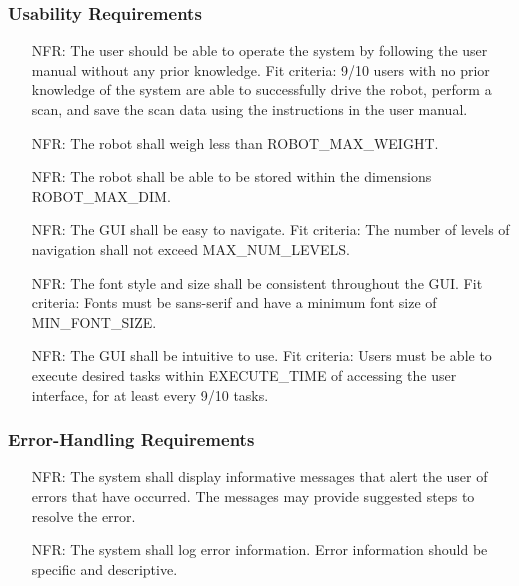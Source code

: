 \documentclass[12pt]{article}
\newcounter{nfrnum} %
\begin{document}
\subsubsection{Usability Requirements}

\noindent \begin{itemize}
\item[NFR\refstepcounter{nfrnum}\thenfrnum \label{NFR_Usability1}:] The user should be able to operate the system by following the user manual without any prior knowledge.
\newline Fit criteria: 9/10 users with no prior knowledge of the system are able to successfully drive the robot, perform a scan, and save the scan data using the instructions in the user manual. 
\item[NFR\refstepcounter{nfrnum}\thenfrnum \label{NFR_Usability2}:] The robot shall weigh less than ROBOT\_MAX\_WEIGHT.
\item[NFR\refstepcounter{nfrnum}\thenfrnum \label{NFR_Usability3}:] The robot shall be able to be stored within the dimensions ROBOT\_MAX\_DIM.
\item[NFR\refstepcounter{nfrnum}\thenfrnum \label{NFR_Usability4}:] The GUI shall be easy to navigate. 
\newline Fit criteria: The number of levels of navigation shall not exceed MAX\_NUM\_LEVELS.
\item[NFR\refstepcounter{nfrnum}\thenfrnum \label{NFR_Usability5}:] The font style and size shall be consistent throughout the GUI. 
\newline Fit criteria: Fonts must be sans-serif and have a minimum font size of MIN\_FONT\_SIZE.
\item[NFR\refstepcounter{nfrnum}\thenfrnum \label{NFR_Usability6}:] The GUI shall be intuitive to use. 
\newline Fit criteria: Users must be able to execute desired tasks within EXECUTE\_TIME of accessing the user interface, for at least every 9/10 tasks.
\end{itemize}

\subsubsection{Error-Handling Requirements}
\noindent \begin{itemize}
\item[NFR\refstepcounter{nfrnum}\thenfrnum \label{NFR_Errors1}:] The system shall display informative messages that alert the user of errors that have occurred. The messages may provide suggested steps to resolve the error.
\item[NFR\refstepcounter{nfrnum}\thenfrnum \label{NFR_Errors2}:] The system shall log error information. Error information should be specific and descriptive.
\end{itemize}
\end{document}
